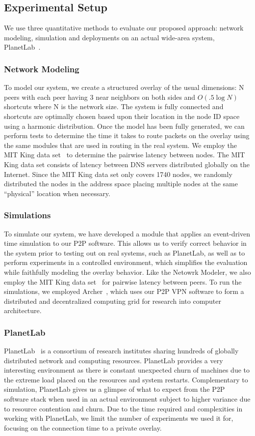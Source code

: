 \documentclass[conference]{IEEEtran}
\begin{document}
\subsection{Experimental Setup}
We use three quantitative methods to evaluate our proposed approach: network
modeling, simulation and deployments on an actual wide-area system,
PlanetLab~\cite{planetlab}.

\subsubsection{Network Modeling}
To model our system, we create a structured overlay of the usual dimensions:
N peers with each peer having 3 near neighbors on both sides and $O(.5\log N)$
shortcuts where N is the network size.  The system is fully connected and
shortcuts are optimally chosen based upon their location in the node ID space
using a harmonic distribution.  Once the model has been fully generated, we can
perform tests to determine the time it takes to route packets on the overlay
using the same modules that are used in routing in the real system.  We employ
the MIT King data set~\cite{king_data} to determine the pairwise latency
between nodes.  The MIT King data set consists of latency between DNS servers
distributed globally on the Internet.  Since the MIT King data set only covers
1740 nodes, we randomly distributed the nodes in the address space placing
multiple nodes at the same ``physical'' location when necessary.

\subsubsection{Simulations}
To simulate our system, we have developed a module that applies an event-driven
time simulation to our P2P software.  This allows us to verify correct behavior
in the system prior to testing out on real systems, such as PlanetLab, as well
as to perform experiments in a controlled environment, which simplifies the
evaluation while faithfully modeling the overlay behavior.  Like the Netowrk
Modeler, we also employ the MIT King data set~\cite{king_data} for pairwise
latency between peers.  To run the simulations, we employed Archer~\cite{archer},
which uses our P2P VPN software to form a distributed and decentralized
computing grid for research into computer architecture.

\subsubsection{PlanetLab}
PlanetLab~\cite{planetlab} is a consortium of research institutes sharing
hundreds of globally distributed network and computing resources.  PlanetLab
provides a very interesting environment as there is constant unexpected churn
of machines due to the extreme load placed on the resources and system restarts.
Complementary to simulation, PlanetLab gives us a glimpse of what to expect from the
P2P software stack when used in an actual environment subject to higher variance due to resource contention and churn.
Due to the time required and complexities in
working with PlanetLab, we limit the number of experiments we used it for,
focusing on the connection time to a private overlay.
\end{document}
